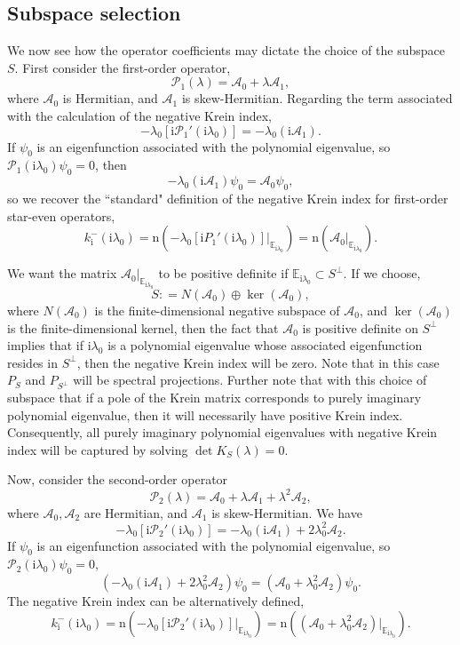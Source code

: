 \documentclass[review,onefignum,onetabnum]{siamart171218}
\newcommand{\E}{\mathbb{E}}
\def\det{\mathop\mathrm{det}\nolimits}
\def\ker{\mathop\mathrm{ker}\nolimits}
\def\coloneqq{\mathrel{\mathop:}=}
\newcommand{\rmi}{\mathrm{i}}
\newcommand{\rmn}{\mathrm{n}}
\newcommand{\calA}{\mathcal{A}}
\newcommand{\calP}{\mathcal{P}}
\newcommand{\vK}{\bm{\mathit{K}}}
\begin{document}
\subsection{Subspace selection}\label{s:22}

We now see how the operator coefficients may dictate the choice of the subspace $S$.
First consider the first-order operator,
\[
\calP_1(\lambda)=\calA_0+\lambda\calA_1,
\]
where $\calA_0$ is Hermitian, and $\calA_1$ is skew-Hermitian. Regarding the term associated with the calculation of the negative Krein index,
\[
-\lambda_0[\rmi\calP_1'(\rmi\lambda_0)]=-\lambda_0(\rmi\calA_1).
\]
If $\psi_0$ is an eigenfunction associated with the polynomial eigenvalue, so
$\calP_1(\rmi\lambda_0)\psi_0=0$, then
\[
-\lambda_0(\rmi\calA_1)\psi_0=\calA_0\psi_0,
\]
so we recover the ``standard" definition of the negative Krein index for
first-order star-even operators,
\[
k_\rmi^-(\rmi\lambda_0)=
\rmn\left(-\lambda_0[\rmi P_1'(\rmi\lambda_0)]|_{\E_{\rmi\lambda_0}}\right)=
\rmn\left(\calA_0|_{\E_{\rmi\lambda_0}}\right).
\]

We want the matrix
$\calA_0|_{\E_{\rmi\lambda_0}}$ to be positive definite if $\E_{\rmi\lambda_0}\subset S^\perp$. If we choose,
\[
S\coloneqq N(\calA_0)\oplus\ker(\calA_0),
\]
where $N(\calA_0)$ is the finite-dimensional negative subspace of $\calA_0$,
and $\ker(\calA_0)$ is the finite-dimensional kernel, then the fact that
$\calA_0$ is positive definite on $S^\perp$ implies that if $\rmi\lambda_0$
is a polynomial eigenvalue whose associated eigenfunction resides in
$S^\perp$, then the negative Krein index will be zero. Note that in this case $P_S$ and $P_{S^\perp}$ will be spectral projections.
Further note that with this choice of subspace that if a pole of the Krein matrix corresponds to purely imaginary polynomial
eigenvalue, then it will necessarily have positive Krein index. Consequently, all purely imaginary polynomial eigenvalues with negative Krein index will be captured by solving $\det\vK_S(\lambda)=0$.


Now, consider the second-order operator
\[
\calP_2(\lambda)=\calA_0+\lambda\calA_1+\lambda^2\calA_2,
\]
where $\calA_0,\calA_2$ are Hermitian, and $\calA_1$ is skew-Hermitian. We
have
\[
-\lambda_0[\rmi \calP_2'(\rmi\lambda_0)]=-\lambda_0(\rmi\calA_1)+2\lambda_0^2\calA_2.
\]
If $\psi_0$ is an eigenfunction associated with the polynomial eigenvalue, so
$\calP_2(\rmi\lambda_0)\psi_0=0$,
\[
\left(-\lambda_0(\rmi\calA_1)+2\lambda_0^2\calA_2\right)\psi_0=\left(\calA_0+\lambda_0^2\calA_2\right)\psi_0.
\]
The negative Krein index can be alternatively defined,
\[
k_\rmi^-(\rmi\lambda_0)=
\rmn\left(-\lambda_0[\rmi\calP_2'(\rmi\lambda_0)]|_{\E_{\rmi\lambda_0}}\right)=
\rmn\left((\calA_0+\lambda_0^2\calA_2)|_{\E_{\rmi\lambda_0}}\right).
\]
\end{document}
